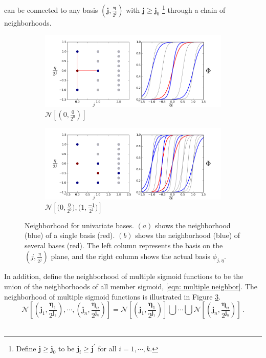 can be connected to any basis $(\boldsymbol{j}, \frac{\boldsymbol{\eta}}{2^{\boldsymbol{j}}})$ 
with $\boldsymbol{j} \ge \boldsymbol{j}_0$ \footnote{ Define $\boldsymbol{j} \ge \boldsymbol{j}_0$
to be $\boldsymbol{j}_i \ge \boldsymbol{j}^\prime$ for all $i=1, \cdots, k$.}
through a chain
of neighborhoods.
\begin{figure}[Htbp]\begin{center}
    \begin{subfigure}[p]{1.\textwidth}
        \centering
        \includegraphics[width=10cm]{../basis_neighbor.png}
        \caption{$\mathcal{N}\left[\left(0,\frac{0}{2^0}\right)\right]$}
        \label{fig: basis neighbor}
    \end{subfigure}
    \begin{subfigure}[p]{1.\textwidth}
        \centering
        \includegraphics[width=10cm]{../basis_neighbor_2.png}
        \caption{$\mathcal{N}\left[ \big(0, \frac{0}{2^0}\big), \big(1, \frac{-1}{2^1}\big)
                 \right]$}
        \label{fig: union neighbor}
    \end{subfigure}
    \caption{Neighborhood for univariate bases. 
             $(a)$ shows the neighborhood (blue)
             of a single basis (red).  $(b)$ shows the neighborhood (blue) 
             of several bases (red). 
             The left column represents the basis on the $\left(j, \frac{\eta}{2^j}\right)$ plane,
             and the right column shows the actual basis $\phi_{j,\eta}$.}
\end{center}\end{figure}
In addition, define the neighborhood of multiple sigmoid functions to be the union
of the neighborhoods of all member sigmoid, \eqref{eqn: multiple neighbor}. The neighborhood of multiple sigmoid functions
is illustrated in Figure \ref{fig: union neighbor}.
\begin{equation}
    \mathcal{N}\left[(\boldsymbol{j}_1, \frac{\boldsymbol{\eta}_1}{2^{\boldsymbol{j}_1}} ), \cdots, 
    ( \boldsymbol{j}_n, \frac{\boldsymbol{\eta}_n}{2^{\boldsymbol{j}_n}}) \right]
    = \mathcal{N}\left[(\boldsymbol{j}_1, \frac{\boldsymbol{\eta}_1}{2^{\boldsymbol{j}_1}})\right]\bigcup \cdots 
      \bigcup \mathcal{N}\left[(\boldsymbol{j}_n, \frac{\boldsymbol{\eta}_n}{2^{\boldsymbol{j}_n}})\right]\,.
\label{eqn: multiple neighbor}
\end{equation}\\

